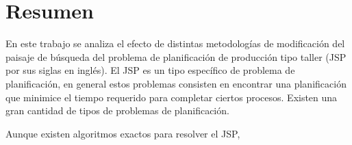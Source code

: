 \chapter*{Resumen}
En este trabajo se analiza el efecto de distintas metodologías de modificación del paisaje de búsqueda del problema de planificación de producción tipo taller (JSP por sus siglas en inglés). 
El JSP es un tipo específico de problema de planificación, en general estos problemas consisten en encontrar una planificación que minimice el tiempo requerido para completar ciertos procesos. Existen una gran cantidad de tipos de problemas de planificación. 

Aunque existen algoritmos exactos para resolver el JSP, 
\let\cleardoublepage\clearpage



